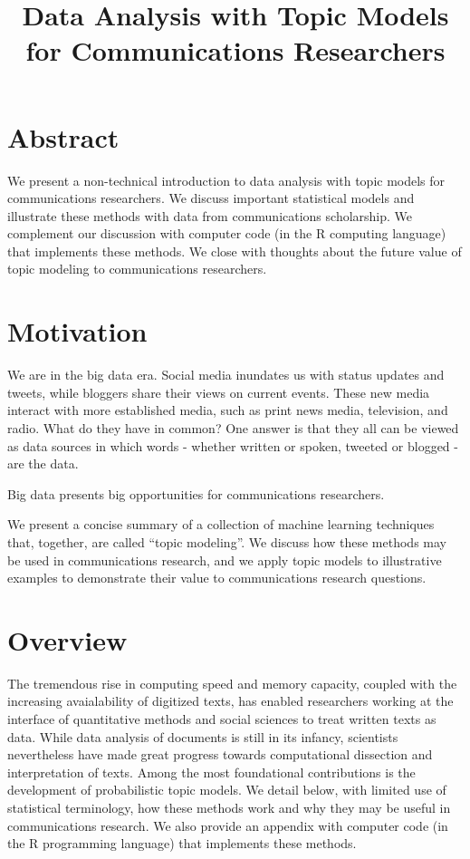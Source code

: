 \documentclass[12pt,]{article}
\title{Data Analysis with Topic Models for Communications Researchers}
\author{}
\date{}
\begin{document}
\maketitle

\listoftodos

\section{Abstract}\label{abstract}

We present a non-technical introduction to data analysis with topic
models for communications researchers. We discuss important statistical
models and illustrate these methods with data from communications
scholarship. We complement our discussion with computer code (in the R
computing language) that implements these methods. We close with
thoughts about the future value of topic modeling to communications
researchers.

\section{Motivation}\label{motivation}


We are in the big data era. Social media inundates us with status
updates and tweets, while bloggers share their views on current events.
These new media interact with more established media, such as print news
media, television, and radio. What do they have in common? One answer is
that they all can be viewed as data sources in which words - whether
written or spoken, tweeted or blogged - are the data.

Big data presents big opportunities for communications researchers.

We present a concise summary of a collection of machine learning
techniques that, together, are called ``topic modeling''. We discuss how
these methods may be used in communications research, and we apply topic
models to illustrative examples to demonstrate their value to
communications research questions.

\section{Overview}\label{overview}

The tremendous rise in computing speed and memory capacity, coupled with
the increasing avaialability of digitized texts, has enabled researchers
working at the interface of quantitative methods and social sciences to
treat written texts as data. While data analysis of documents is still
in its infancy, scientists nevertheless have made great progress towards
computational dissection and interpretation of texts. Among the most
foundational contributions is the development of probabilistic topic
models. We detail below, with limited use of statistical terminology,
how these methods work and why they may be useful in communications
research. We also provide an appendix with computer code (in the R
programming language) that implements these methods.
\end{document}

